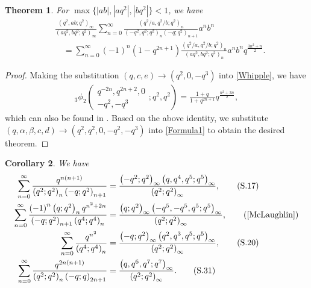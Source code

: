 \documentclass[reqno,12pt]{amsart}
\newtheorem{theorem}{Theorem}[section]%
\newtheorem{corollary}[theorem]{Corollary}
\theoremstyle{remark}
\numberwithin{equation}{section}
\begin{document}
\begin{theorem}\label{thm10}
For $\max\{|ab|,|aq^2|,|bq^2|\}<1$, we have
\begin{align*}
&\frac{\left(q^2,ab;q^2\right)_{\infty}}{\left(aq^2,bq^2;q^2\right)_{\infty}}
\sum_{n=0}^{\infty}
\frac{\left(q^2/a,q^2/b;q^2\right)_n}{\left(-q^2,q^2;q^2\right)_n\left(-q;q^2\right)_{n+1}}a^nb^n\\
&\quad=\sum_{n=0}^{\infty}\left(-1\right)^n\left(1-q^{2n+1}\right)
\frac{\left(q^2/a,q^2/b;q^2\right)_n}{\left(aq^2,bq^2;q^2\right)_n}
a^nb^nq^{\frac{3n^2+n}{2}}.
\end{align*}
\end{theorem}
\begin{proof}
Making the substitution $\left(q,c,e\right)\to\left(q^2,0,-q^3\right)$ into \eqref{Whipple}, we have
\begin{align}
{_3\phi_2}\left(
\begin{array}{ccc}
q^{-2n},q^{2n+2},0\\
-q^2,-q^3
\end{array};q^2,q^2\right)
=
\frac{1+q}{1+q^{2n+1}}q^{\frac{n^2+3n}{2}},\label{A18}
\end{align}
which can also be found in \cite[Eq. (3.13)]{Wang}.
Based on the above identity,  we substitute $\left(q,\alpha,\beta,c,d\right)\to\left(q^2,q^2,0,-q^2,-q^3\right)$ into \eqref{Formula1} to obtain the desired theorem.
\end{proof}
\begin{corollary}
We have
\begin{align}
\sum_{n=0}^{\infty}\frac{q^{n\left(n+1\right)}}
{\left(q^2;q^2\right)_n\left(-q;q^2\right)_{n+1}}
&=
\frac{\left(-q^2;q^2\right)_{\infty}\left(q,q^4,q^5;q^5\right)_{\infty}}
{\left(q^2;q^2\right)_{\infty}},\tag{S.17}\label{S.17}\\
\sum_{n=0}^{\infty}\frac{\left(-1\right)^n\left(q;q^2\right)_nq^{n^2+2n}}
{\left(-q;q^2\right)_{n+1}\left(q^4;q^4\right)_n}
&=\frac{\left(q;q^2\right)_{\infty}\left(-q^5,-q^5,q^5;q^5\right)_{\infty}}
{\left(q^2;q^2\right)_{\infty}},\tag{\rm{\cite[Eq. (2.5)]{McLaughlin}}}\label{new1}\\
\sum_{n=0}^{\infty}\frac{q^{n^2}}{\left(q^4;q^4\right)_n}
&=\frac{\left(-q;q^2\right)_{\infty}\left(q^2,q^3,q^5;q^5\right)_{\infty}}
{\left(q^2;q^2\right)_{\infty}},\tag{S.20}\label{S.20}\\
\sum_{n=0}^{\infty}\frac{q^{2n\left(n+1\right)}}
{\left(q^2;q^2\right)_n\left(-q;q\right)_{2n+1}}
&=\frac{\left(q,q^6,q^7;q^7\right)_{\infty}}
{\left(q^2;q^2\right)_{\infty}}.\tag{S.31}\label{S.31}
\end{align}
\end{corollary}
\end{document}
